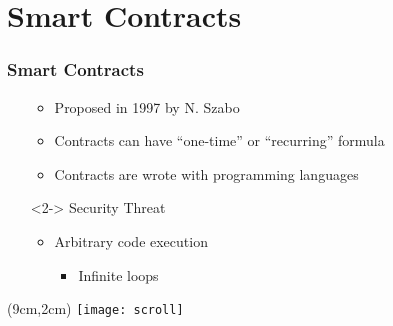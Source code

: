 \section{Smart Contracts}
\begin{frame}
  \frametitle{Smart Contracts}

  \begin{itemize}
   \item[]
    \begin{itemize}
      \item Proposed in 1997 by N. Szabo
      \item Contracts can have ``one-time'' or ``recurring'' formula
      \item Contracts are wrote with programming languages
    \end{itemize}

   \item[]<2-> Security Threat
    \begin{itemize}
     \item Arbitrary code execution
     \begin{itemize}
      \item Infinite loops
     \end{itemize}
    \end{itemize}
  \end{itemize}


  \begin{textblock*}{5cm}(9cm,2cm)
    \texttt{[image: scroll]}
  \end{textblock*}

\end{frame}

